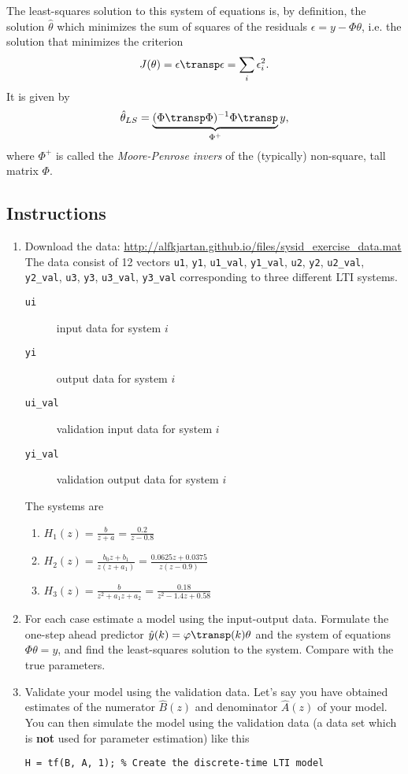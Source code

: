 \documentclass[letterpaper]{scrartcl}
\begin{document}
The least-squares solution to this system of equations is, by definition, the solution \(\hat{\theta}\) which minimizes the sum of squares of the residuals \(\epsilon = y-\Phi\theta\), i.e. the solution that minimizes the criterion
\[ J(\theta) = \epsilon\transp\epsilon = \sum_i \epsilon_i^2. \] 
It is given by 
\[ \hat{\theta}_{LS} = \underbrace{(\Phi\transp\Phi)^{-1}\Phi\transp}_{\Phi^+} y, \]
where \(\Phi^+\) is called the \emph{Moore-Penrose invers} of the (typically) non-square, tall matrix \(\Phi\). 

\subsection{Instructions}
\label{sec-1-1}
\begin{enumerate}
\item Download the data: \url{http://alfkjartan.github.io/files/sysid_exercise_data.mat} The data consist of 12 vectors \texttt{u1}, \texttt{y1}, \texttt{u1\_val}, \texttt{y1\_val}, \texttt{u2}, \texttt{y2}, \texttt{u2\_val}, \texttt{y2\_val}, \texttt{u3}, \texttt{y3}, \texttt{u3\_val}, \texttt{y3\_val} corresponding to three different LTI systems.
\begin{description}
\item[{\texttt{ui}}] input data for system \(i\)
\item[{\texttt{yi}}] output data for system \(i\)
\item[{\texttt{ui\_val}}] validation input data for system \(i\)
\item[{\texttt{yi\_val}}] validation output data for system \(i\)
\end{description}
The systems are 
\begin{enumerate}
\item \( H_1(z) = \frac{b}{z+a} = \frac{0.2}{z -0.8} \)
\item \( H_2(z) = \frac{b_0 z + b_1}{z(z+a_1)} = \frac{0.0625z + 0.0375}{z(z - 0.9)} \)
\item \( H_3(z) = \frac{b}{z^2 + a_1z + a_2} = \frac{0.18}{z^2 - 1.4z + 0.58} \)
\end{enumerate}
\item For each case estimate a model using the input-output data. Formulate the one-step ahead predictor \( \hat{y}(k) = \varphi\transp(k)\theta \) and the system of equations 
\( \Phi \theta = y \), and find the least-squares solution to the system. Compare with the true parameters.
\item Validate your model using the validation data. Let's say you have obtained estimates of the numerator \(\hat{B}(z)\) and denominator \(\hat{A}(z)\) of your model. You can then simulate the model using the validation data (a data set which is \textbf{not} used for parameter estimation) like this
\begin{verbatim}
H = tf(B, A, 1); % Create the discrete-time LTI model


\end{verbatim}
\end{enumerate}
\end{document}
